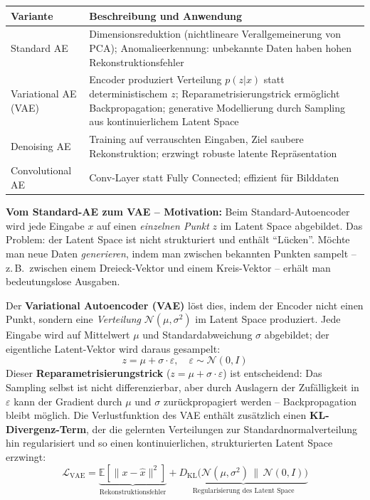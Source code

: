 \begin{table}[H]
\centering
\begin{tabular}{p{4cm} p{12cm}}
\hline
\textbf{Variante} & \textbf{Beschreibung und Anwendung} \\
\hline
Standard AE & Dimensionsreduktion (nichtlineare Verallgemeinerung von PCA); Anomalieerkennung: unbekannte Daten haben hohen Rekonstruktionsfehler \\
Variational AE (VAE) & Encoder produziert Verteilung $p(z|x)$ statt deterministischem $z$; Reparametrisierungstrick ermöglicht Backpropagation; generative Modellierung durch Sampling aus kontinuierlichem Latent Space \\
Denoising AE & Training auf verrauschten Eingaben, Ziel saubere Rekonstruktion; erzwingt robuste latente Repräsentation \\
Convolutional AE & Conv-Layer statt Fully Connected; effizient für Bilddaten \\
\hline
\end{tabular}
\end{table}

\textbf{Vom Standard-AE zum VAE -- Motivation:} Beim Standard-Autoencoder wird jede Eingabe $x$ auf einen \emph{einzelnen Punkt} $z$ im Latent Space abgebildet. Das Problem: der Latent Space ist nicht strukturiert und enthält ``Lücken''. Möchte man neue Daten \emph{generieren}, indem man zwischen bekannten Punkten sampelt -- z.\,B.\ zwischen einem Dreieck-Vektor und einem Kreis-Vektor -- erhält man bedeutungslose Ausgaben.

Der \textbf{Variational Autoencoder (VAE)} löst dies, indem der Encoder nicht einen Punkt, sondern eine \emph{Verteilung} $\mathcal{N}(\mu, \sigma^2)$ im Latent Space produziert. Jede Eingabe wird auf Mittelwert $\mu$ und Standardabweichung $\sigma$ abgebildet; der eigentliche Latent-Vektor wird daraus gesampelt:
\[
z = \mu + \sigma \cdot \varepsilon, \quad \varepsilon \sim \mathcal{N}(0, I)
\]
Dieser \textbf{Reparametrisierungstrick} ($z = \mu + \sigma\cdot\varepsilon$) ist entscheidend: Das Sampling selbst ist nicht differenzierbar, aber durch Auslagern der Zufälligkeit in $\varepsilon$ kann der Gradient durch $\mu$ und $\sigma$ zurückpropagiert werden -- Backpropagation bleibt möglich. Die Verlustfunktion des VAE enthält zusätzlich einen \textbf{KL-Divergenz-Term}, der die gelernten Verteilungen zur Standardnormalverteilung hin regularisiert und so einen kontinuierlichen, strukturierten Latent Space erzwingt:
\[
\mathcal{L}_\text{VAE} = \underbrace{\mathbb{E}[\|x - \hat{x}\|^2]}_{\text{Rekonstruktionsfehler}} + \underbrace{D_\text{KL}\!\bigl(\mathcal{N}(\mu,\sigma^2)\,\|\,\mathcal{N}(0,I)\bigr)}_{\text{Regularisierung des Latent Space}}
\]

